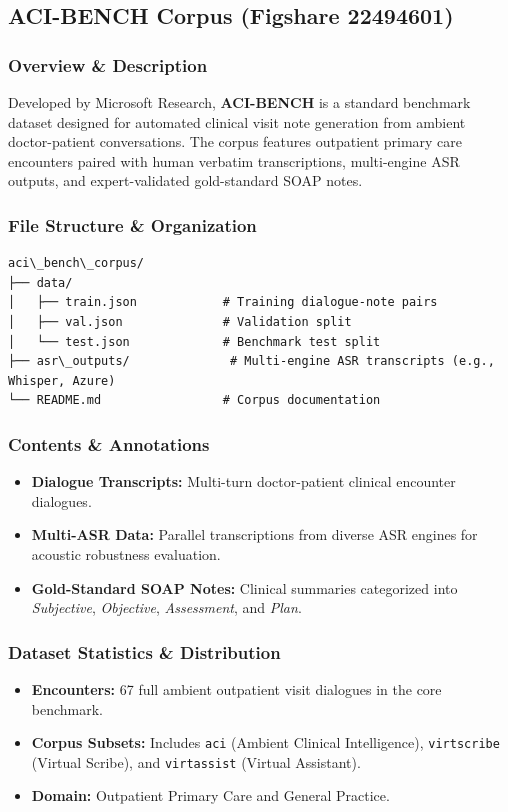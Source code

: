 \subsection{ACI-BENCH Corpus (Figshare 22494601)}
\label{subsec:aci\_bench}

\subsubsection*{Overview \& Description}
Developed by Microsoft Research, \textbf{ACI-BENCH} is a standard benchmark dataset designed for automated clinical visit note generation from ambient doctor-patient conversations. The corpus features outpatient primary care encounters paired with human verbatim transcriptions, multi-engine ASR outputs, and expert-validated gold-standard SOAP notes.

\subsubsection*{File Structure \& Organization}
\begin{verbatim}
aci\_bench\_corpus/
├── data/
│   ├── train.json            # Training dialogue-note pairs
│   ├── val.json              # Validation split
│   └── test.json             # Benchmark test split
├── asr\_outputs/              # Multi-engine ASR transcripts (e.g., Whisper, Azure)
└── README.md                 # Corpus documentation
\end{verbatim}

\subsubsection*{Contents \& Annotations}
\begin{itemize}
    \item \textbf{Dialogue Transcripts:} Multi-turn doctor-patient clinical encounter dialogues.
    \item \textbf{Multi-ASR Data:} Parallel transcriptions from diverse ASR engines for acoustic robustness evaluation.
    \item \textbf{Gold-Standard SOAP Notes:} Clinical summaries categorized into \textit{Subjective}, \textit{Objective}, \textit{Assessment}, and \textit{Plan}.
\end{itemize}

\subsubsection*{Dataset Statistics \& Distribution}
\begin{itemize}
    \item \textbf{Encounters:} 67 full ambient outpatient visit dialogues in the core benchmark.
    \item \textbf{Corpus Subsets:} Includes \texttt{aci} (Ambient Clinical Intelligence), \texttt{virtscribe} (Virtual Scribe), and \texttt{virtassist} (Virtual Assistant).
    \item \textbf{Domain:} Outpatient Primary Care and General Practice.
\end{itemize}

